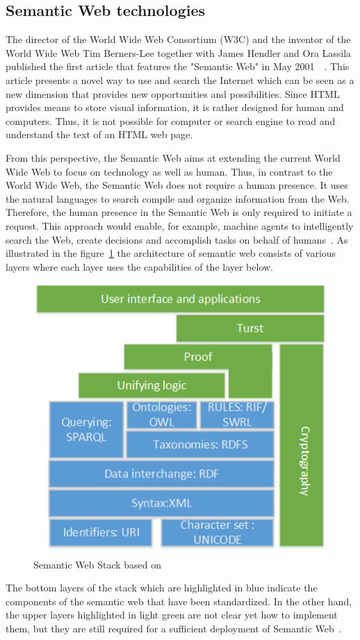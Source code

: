 \subsection{Semantic Web technologies }
The director of the World Wide Web Consortium (W3C) and the inventor of the World Wide Web Tim Berners-Lee together with James Hendler and Ora Lassila published the first article that features the "Semantic Web" in May 2001~\cite{hi}~\cite{rb}. This article presents a novel way to use and search the Internet which can be seen as a new dimension that provides new opportunities and possibilities. Since HTML provides means to store visual information, it is rather designed for human and computers. Thus, it is not possible for computer or search engine to read and understand the text of an HTML web page. \par 
From this perspective, the Semantic Web aims at extending the current World Wide Web to focus on technology as well as human. Thus, in contrast to the World Wide Web, the Semantic Web does not require a human presence. It uses the natural languages to search compile and organize information from the Web. Therefore, the human presence in the Semantic Web is only required to initiate a request. This approach would enable, for example, machine agents to intelligently search the Web, create decisions and accomplish tasks on behalf of humans~\cite{rb}.
As illustrated in the figure~\ref{fig:contrib2:stack} the architecture of semantic web consists of various layers where each layer uses the capabilities of the layer below. 
\begin{figure}[htbp]
    \centering
    \includegraphics[width=.6\textwidth]{resources/images/stack}
    \caption{Semantic Web Stack based on~\cite{layer}}\label{fig:contrib2:stack}
\end{figure}
The bottom layers of the stack which are highlighted in blue indicate the components of the semantic web that have been standardized. In the other hand, the upper layers highlighted in light green are not clear yet how to implement them, but they are still required for a sufficient deployment of Semantic Web~\cite{layer}. \par
